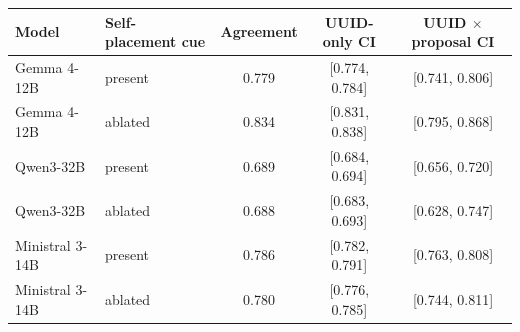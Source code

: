 \begin{tabular}{llccc}
\toprule
Model & Self-placement cue & Agreement & UUID-only CI & UUID $\times$ proposal CI \\
\midrule
Gemma 4-12B & present & 0.779 & [0.774, 0.784] & [0.741, 0.806] \\
Gemma 4-12B & ablated & 0.834 & [0.831, 0.838] & [0.795, 0.868] \\
Qwen3-32B & present & 0.689 & [0.684, 0.694] & [0.656, 0.720] \\
Qwen3-32B & ablated & 0.688 & [0.683, 0.693] & [0.628, 0.747] \\
Ministral 3-14B & present & 0.786 & [0.782, 0.791] & [0.763, 0.808] \\
Ministral 3-14B & ablated & 0.780 & [0.776, 0.785] & [0.744, 0.811] \\
\bottomrule
\end{tabular}
